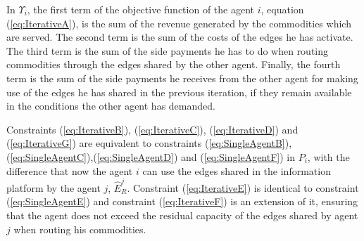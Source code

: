 \documentclass{article}
\begin{document}
In $\Upsilon_i$, the first term of the objective function of the agent $i$, equation (\ref{eq:IterativeA}), is the sum of the revenue generated by the commodities which are served. The second term is the sum of the costs of the edges he has activate. The third term is the sum of the side payments he has to do when routing commodities through the edges shared by the other agent. Finally, the fourth term is the sum of the side payments he receives from the other agent for making use of the edges he has shared in the previous iteration, if they remain available in the conditions the other agent has demanded.

Constraints (\ref{eq:IterativeB}), (\ref{eq:IterativeC}), (\ref{eq:IterativeD}) and (\ref{eq:IterativeG}) are equivalent to constraints (\ref{eq:SingleAgentB}),(\ref{eq:SingleAgentC}),(\ref{eq:SingleAgentD}) and (\ref{eq:SingleAgentF}) in $P_i$, with the difference that now the agent $i$ can use the edges shared in the information platform by the agent $j$, $\widehat{E}_R^j$. Constraint (\ref{eq:IterativeE}) is identical to constraint (\ref{eq:SingleAgentE}) and constraint (\ref{eq:IterativeF}) is an extension of it, ensuring that the agent does not exceed the residual capacity of the edges shared by agent $j$ when routing his commodities.
\end{document}
